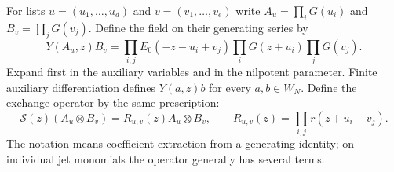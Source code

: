 For lists $u=(u_1,\ldots,u_d)$ and $v=(v_1,\ldots,v_e)$ write
$A_u=\prod_iG(u_i)$ and $B_v=\prod_jG(v_j)$. Define the field
on their generating series by
\begin{equation}\label{cyjets:eq:field}
 Y(A_u,z)B_v=
 \prod_{i,j}E_0(-z-u_i+v_j)
 \prod_iG(z+u_i)\prod_jG(v_j).
\end{equation}
Expand first in the auxiliary variables and in the nilpotent parameter.
Finite auxiliary differentiation defines $Y(a,z)b$ for every
$a,b\in W_N$. Define the exchange operator by the same prescription:
\begin{equation}\label{cyjets:eq:exchange}
 \mathcal S(z)(A_u\otimes B_v)=
 R_{u,v}(z)A_u\otimes B_v,\qquad
 R_{u,v}(z)=\prod_{i,j}r(z+u_i-v_j).
\end{equation}
The notation means coefficient extraction from a generating identity;
on individual jet monomials the operator generally has several terms.

